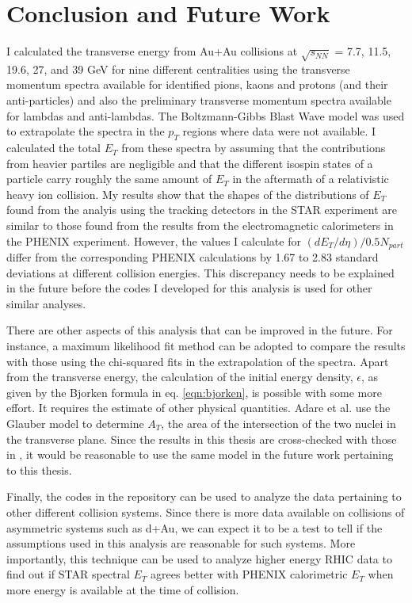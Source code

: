 \chapter{Conclusion and Future Work} \label{ch:conclusion}
I calculated the transverse energy from Au+Au collisions at $\sqrt{s_{NN}}$ = 7.7, 11.5, 19.6, 27, and 39 GeV for nine different centralities using the transverse momentum spectra available for identified pions, kaons and protons (and their anti-particles) and also the preliminary transverse momentum spectra available for lambdas and anti-lambdas. The Boltzmann-Gibbs Blast Wave model was used to extrapolate the spectra in the $p_{T}$ regions where data were not available. I calculated the total $E_{T}$ from these spectra by assuming that the contributions from heavier partiles are negligible and that the different isospin states of a particle carry roughly the same amount of $E_{T}$ in the aftermath of a relativistic heavy ion collision. My results show that the shapes of the distributions of $E_{T}$ found from the analyis using the tracking detectors in the STAR experiment are similar to those found from the results from the electromagnetic calorimeters in the PHENIX experiment. However, the values I calculate for $(dE_{T}/d\eta)/0.5N_{part}$ differ from the corresponding PHENIX calculations by 1.67 to 2.83 standard deviations at different collision energies. This discrepancy needs to be explained in the future before the codes I developed for this analysis is used for other similar analyses.

There are other aspects of this analysis that can be improved in the future. For instance, a maximum likelihood fit method can be adopted to compare the results with those using the chi-squared fits in the extrapolation of the spectra. Apart from the transverse energy, the calculation of the initial energy density, $\epsilon$, as given by the Bjorken formula in eq. \ref{eqn:bjorken}, is possible with some more effort. It requires the estimate of other physical quantities. Adare et al.\cite{PhysRevC.93.024901} use the Glauber model to determine $A_{T}$, the area of the intersection of the two nuclei in the transverse plane. Since the results in this thesis are cross-checked with those in \cite{PhysRevC.93.024901}, it would be reasonable to use the same model in the future work pertaining to this thesis.%

Finally, the codes in the repository can be used to analyze the data pertaining to other different collision systems. Since there is more data available on collisions of asymmetric systems such as d+Au, we can expect it to be a test to tell if the assumptions used in this analysis are reasonable for such systems. More importantly, this technique can be used to analyze higher energy RHIC data to find out if STAR spectral $E_{T}$ agrees better with PHENIX calorimetric $E_{T}$ when more energy is available at the time of collision.

